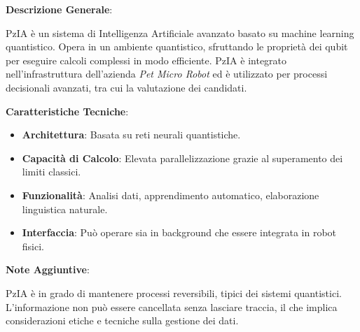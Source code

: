 \vspace{0.5cm}

\begin{tcolorbox}[colback=white,colframe=black,title=\textbf{PzIA (Physical Zeno Intelligenza Arficiale)}]
\begin{multicols}{2}
\textbf{Descrizione Generale}:

PzIA è un sistema di Intelligenza Artificiale avanzato basato su machine learning quantistico. Opera in un ambiente quantistico, sfruttando le proprietà dei qubit per eseguire calcoli complessi in modo efficiente. PzIA è integrato nell'infrastruttura dell'azienda \emph{Pet Micro Robot} ed è utilizzato per processi decisionali avanzati, tra cui la valutazione dei candidati.

\textbf{Caratteristiche Tecniche}:
\begin{itemize}
    \item \textbf{Architettura}: Basata su reti neurali quantistiche.
    \item \textbf{Capacità di Calcolo}: Elevata parallelizzazione grazie al superamento dei limiti classici.
    \item \textbf{Funzionalità}: Analisi dati, apprendimento automatico, elaborazione linguistica naturale.
    \item \textbf{Interfaccia}: Può operare sia in background che essere integrata in robot fisici.
\end{itemize}

\textbf{Note Aggiuntive}:

PzIA è in grado di mantenere processi reversibili, tipici dei sistemi quantistici. L'informazione non può essere cancellata senza lasciare traccia, il che implica considerazioni etiche e tecniche sulla gestione dei dati.

\end{multicols}
\end{tcolorbox}

\vspace{0.5cm}

